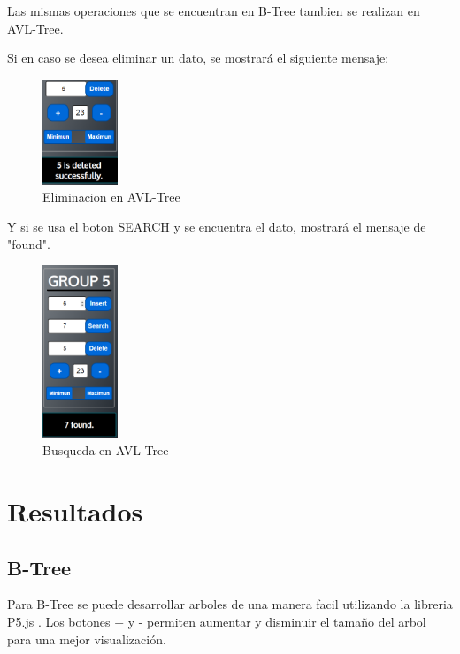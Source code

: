 \documentclass{article}
\begin{document}
Las mismas operaciones que se encuentran en B-Tree tambien se realizan en AVL-Tree. 

Si en caso se desea eliminar un dato, se mostrará el siguiente mensaje:

        \begin{figure}[H]
        \centering
        \includegraphics[width=0.2\textwidth]{img/avl_delet.PNG}
        \caption{Eliminacion en AVL-Tree}
        \end{figure}

   Y si se usa el boton SEARCH y se encuentra el dato, mostrará el mensaje de "found".

        \begin{figure}[H]
        \centering
        \includegraphics[width=0.2\textwidth]{img/avl_found.PNG}
        \caption{Busqueda en AVL-Tree}
        \end{figure}

        
\section{Resultados}


\subsection{B-Tree} 

Para B-Tree se puede desarrollar arboles de una manera facil utilizando la libreria P5.js .
Los botones + y - permiten aumentar y disminuir el tamaño del arbol para una mejor visualización.
\end{document}
